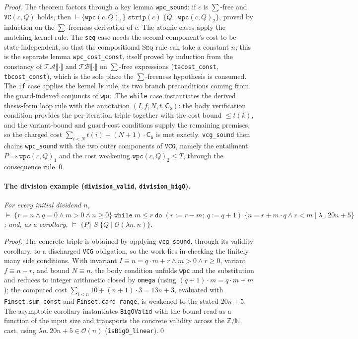 \documentclass[runningheads]{llncs}
\newcommand{\Nat}{\mathbb{N}}
\newcommand{\Int}{\mathbb{Z}}
\newcommand{\tacost}[1]{\mathcal{T\!A}\llbracket #1 \rrbracket}
\newcommand{\tbcost}[1]{\mathcal{T\!B}\llbracket #1 \rrbracket}
\newcommand{\triple}[4]{\{#1\}\;#2\;\{#3 \mid #4\}}
\newcommand{\cst}[1]{\mathsf{C_{#1}}}
\newcommand{\Valid}{\vDash}
\newcommand{\BigO}{\mathcal{O}}
\newcommand{\code}[1]{\texttt{#1}}
\begin{document}
\begin{proof}
The theorem factors through a key lemma \code{wpc\_sound}: if $c$ is $\sum$-free
and $\code{VC}(c,Q)$ holds, then
$\vdash \triple{\code{wpc}(c,Q)_1}{\code{strip}(c)}{Q}{\code{wpc}(c,Q)_2}$,
proved by induction on the $\sum$-freeness derivation of $c$. The atomic cases
apply the matching kernel rule. The \code{seq} case needs the second component's
cost to be state-independent, so that the compositional \textsc{Seq} rule can take
a constant $n$; this is the separate lemma \code{wpc\_cost\_const}, itself proved by
induction from the constancy of $\tacost{\cdot}$ and $\tbcost{\cdot}$ on
$\sum$-free expressions (\code{tacost\_const}, \code{tbcost\_const}), which is the
sole place the $\sum$-freeness hypothesis is consumed. The \code{if} case applies
the kernel \textsc{If} rule, its two branch preconditions coming from the
guard-indexed conjuncts of \code{wpc}. The \code{while} case instantiates the
derived thesis-form loop rule with the annotation $(I,f,N,t,\cst{b})$: the body
verification condition provides the per-iteration triple together with the cost
bound ${}\le t(k)$, and the variant-bound and guard-cost conditions supply the
remaining premises, so the charged cost
$\sum_{i<N} t(i) + (N+1)\cdot\cst{b}$ is met exactly. \code{vcg\_sound} then chains
\code{wpc\_sound} with the two outer components of $\code{VCG}$, namely the
entailment $P \Rightarrow \code{wpc}(c,Q)_1$ and the cost weakening
$\code{wpc}(c,Q)_2 \le T$, through the consequence rule.\qed
\end{proof}

\paragraph{The division example (\code{division\_valid}, \code{division\_bigO}).}
\emph{For every initial dividend $n$,
$\Valid\;\triple{r = n \wedge q = 0 \wedge m > 0 \wedge n \ge 0}
{\code{while}\;m \le r\;\code{do}\;(r := r - m;\ q := q + 1)}
{n = r + m\cdot q \wedge r < m}{\lambda\_.\,20n + 5}$;
and, as a corollary, $\Valid\;\triple{P}{S}{Q}{\BigO(\lambda n.\,n)}$.}

\begin{proof}
The concrete triple is obtained by applying \code{vcg\_sound}, through its validity
corollary, to a discharged \code{VCG} obligation, so the work lies in checking the
finitely many side conditions. With invariant
$I \equiv n = q\cdot m + r \wedge m>0 \wedge r\ge 0$, variant $f \equiv n - r$, and
bound $N \equiv n$, the body condition unfolds \code{wpc} and the substitution and
reduces to integer arithmetic closed by \code{omega} (using
$(q{+}1)\cdot m = q\cdot m + m$); the computed cost
$\sum_{i<n} 10 + (n{+}1)\cdot 3 = 13n + 3$, evaluated with \code{Finset.sum\_const}
and \code{Finset.card\_range}, is weakened to the stated $20n+5$. The asymptotic
corollary instantiates \code{BigOValid} with the bound read as a function of the
input size and transports the concrete validity across the $\Int$/$\Nat$ cast,
using $\lambda n.\,20n+5 \in \BigO(n)$ (\code{isBigO\_linear}).\qed
\end{proof}
\end{document}
